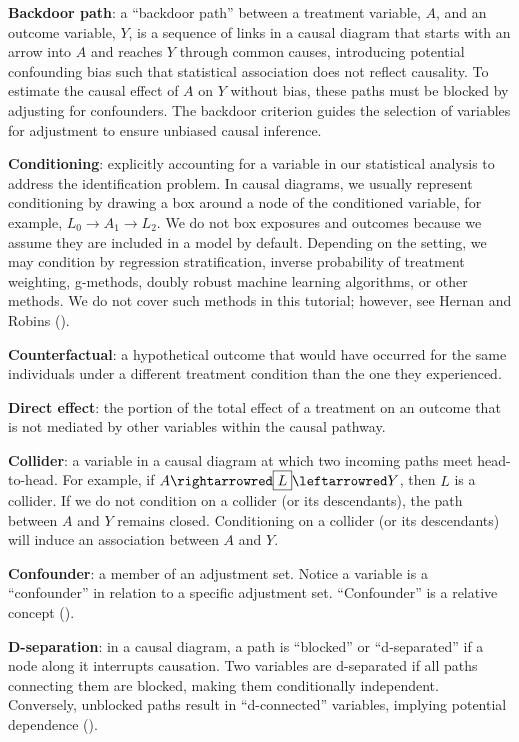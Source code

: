 \documentclass[
  singlecolumn]{article}
\begin{document}
\textbf{Backdoor path}: a ``backdoor path'' between a treatment
variable, \(A\), and an outcome variable, \(Y\), is a sequence of links
in a causal diagram that starts with an arrow into \(A\) and reaches
\(Y\) through common causes, introducing potential confounding bias such
that statistical association does not reflect causality. To estimate the
causal effect of \(A\) on \(Y\) without bias, these paths must be
blocked by adjusting for confounders. The backdoor criterion guides the
selection of variables for adjustment to ensure unbiased causal
inference.

\textbf{Conditioning}: explicitly accounting for a variable in our
statistical analysis to address the identification problem. In causal
diagrams, we usually represent conditioning by drawing a box around a
node of the conditioned variable, for example,
\(\boxed{L_{0}}\to A_{1} \to L_{2}\). We do not box exposures and
outcomes because we assume they are included in a model by default.
Depending on the setting, we may condition by regression stratification,
inverse probability of treatment weighting, g-methods, doubly robust
machine learning algorithms, or other methods. We do not cover such
methods in this tutorial; however, see Hernan and Robins
().

\textbf{Counterfactual}: a hypothetical outcome that would have occurred
for the same individuals under a different treatment condition than the
one they experienced.

\textbf{Direct effect}: the portion of the total effect of a treatment
on an outcome that is not mediated by other variables within the causal
pathway.

\textbf{Collider}: a variable in a causal diagram at which two incoming
paths meet head-to-head. For example, if
\(A \rightarrowred \boxed{L} \leftarrowred Y\), then \(L\) is a
collider. If we do not condition on a collider (or its descendants), the
path between \(A\) and \(Y\) remains closed. Conditioning on a collider
(or its descendants) will induce an association between \(A\) and \(Y\).

\textbf{Confounder}: a member of an adjustment set. Notice a variable is
a ``confounder'' in relation to a specific adjustment set.
``Confounder'' is a relative concept ().

\textbf{D-separation}: in a causal diagram, a path is ``blocked'' or
``d-separated'' if a node along it interrupts causation. Two variables
are d-separated if all paths connecting them are blocked, making them
conditionally independent. Conversely, unblocked paths result in
``d-connected'' variables, implying potential dependence
().
\end{document}
